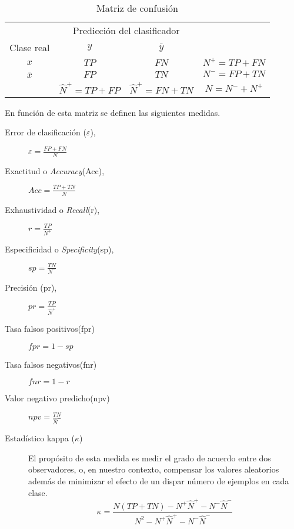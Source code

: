 \begin{table}[H]
\centering
\begin{tabular}{cccc}
\cline{1-3}
\multicolumn{1}{|c|}{}           & \multicolumn{2}{c|}{Predicción del clasificador}      &                 \\ \cline{1-3}
\multicolumn{1}{|c|}{Clase real} & \multicolumn{1}{c|}{$y$}    & \multicolumn{1}{c|}{$\bar{y}$}    &                 \\ \cline{1-3}
\multicolumn{1}{|c|}{$x$}          & \multicolumn{1}{c|}{$TP$} & \multicolumn{1}{c|}{$FN$} & $N^+ = TP + FN$ \\ \cline{1-3}
\multicolumn{1}{|c|}{$\bar{x}$}          & \multicolumn{1}{c|}{$FP$} & \multicolumn{1}{c|}{$TN$} & $N^- = FP + TN$ \\ \cline{1-3}
                                & $\hat{N}^+ = TP + FP$     & $\hat{N}^+ = FN + TN$     &   $N = N^- + N^+$             
\end{tabular}
\caption{Matriz de confusión}
\label{tab:matrizconfusion}
\end{table} 

En función de esta matriz se definen las siguientes
medidas.
	
\begin{description}
	\item[Error de clasificación ($\varepsilon$),] 
		$\varepsilon = \frac{FP+FN}{N}$
	\item[Exactitud o \textit{Accuracy}(Acc),] 
		$Acc=\frac{TP+TN}{N}$
	\item[Exhaustividad o \textit{Recall}(r),] $r=\frac{TP}{N^+}$
	\item[Especificidad o \textit{Specificity}(sp),] 
		$sp=\frac{TN}{N^-}$
	\item[Precisión (pr),] 
		$pr=\frac{TP}{\hat{N}^+}$
	\item[Tasa falsos positivos(fpr)] $fpr=1-sp$
	\item[Tasa falsos negativos(fnr)] $fnr=1-r$
	\item[Valor negativo predicho(npv)] 
		$npv=\frac{TN}{\hat{N}^-}$
	\item[Estadístico kappa ($\kappa$)] El propósito de esta 
		medida es medir el grado de acuerdo entre dos 
		observadores, o, en nuestro contexto, compensar los 
		valores aleatorios además de minimizar el efecto de 
		un dispar número de ejemplos en cada clase. 
	\[ 
	\kappa = \frac{N(TP + TN) - N^+\hat{N}^+ - N^-\hat{N}^- }
				  {N^2 - N^+\hat{N}^+ - N^-\hat{N}^- }
	\]
\end{description}
	
